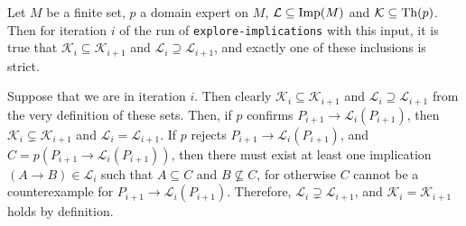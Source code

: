 \begin{Proposition}
  \label{prop:technicalities-about-explore-implications}
  Let $M$ be a finite set, $p$ a domain expert on $M$, $\mathcal{L} \subseteq \operatorname{Imp}(M)$ and
  $\mathcal{K} \subseteq \operatorname{Th}(p)$.  Then for iteration $i$ of the run of
  \lstinline{explore-implications} with this input, it is true that $\mathcal{K}_i
  \subseteq \mathcal{K}_{i+1}$ and $\mathcal{L}_i \supseteq \mathcal{L}_{i+1}$, and
  exactly one of these inclusions is strict.
\end{Proposition}
\begin{Proof}
  Suppose that we are in iteration $i$.  Then clearly $\mathcal{K}_i \subseteq
  \mathcal{K}_{i+1}$ and $\mathcal{L}_i \supseteq \mathcal{L}_{i+1}$ from the very
  definition of these sets.  Then, if $p$ confirms $P_{i+1} \to \mathcal{L}_i(P_{i+1})$,
  then $\mathcal{K}_i \subsetneq \mathcal{K}_{i+1}$ and $\mathcal{L}_i =
  \mathcal{L}_{i+1}$.  If $p$ rejects $P_{i+1} \to \mathcal{L}_i(P_{i+1})$, and $C =
  p(P_{i+1} \to \mathcal{L}_i(P_{i+1}))$, then there must exist at least one implication
  $(A \to B) \in \mathcal{L}_i$ such that $A \subseteq C$ and $B \not\subseteq C$, for
  otherwise $C$ cannot be a counterexample for $P_{i+1} \to \mathcal{L}_i(P_{i+1})$.
  Therefore, $\mathcal{L}_i \supsetneq \mathcal{L}_{i+1}$, and $\mathcal{K}_i =
  \mathcal{K}_{i+1}$ holds by definition.
\end{Proof}


